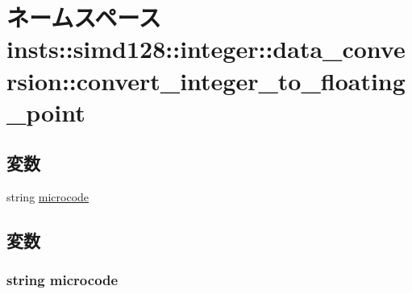 \hypertarget{namespaceinsts_1_1simd128_1_1integer_1_1data__conversion_1_1convert__integer__to__floating__point}{
\section{ネームスペース insts::simd128::integer::data\_\-conversion::convert\_\-integer\_\-to\_\-floating\_\-point}
\label{namespaceinsts_1_1simd128_1_1integer_1_1data__conversion_1_1convert__integer__to__floating__point}
}
\subsection*{変数}
\begin{DoxyCompactItemize}
\item 
string \hyperlink{namespaceinsts_1_1simd128_1_1integer_1_1data__conversion_1_1convert__integer__to__floating__point_a770f11a173e99389a8802f0107ed8f52}{microcode}
\end{DoxyCompactItemize}


\subsection{変数}
\hypertarget{namespaceinsts_1_1simd128_1_1integer_1_1data__conversion_1_1convert__integer__to__floating__point_a770f11a173e99389a8802f0107ed8f52}{
\subsubsection[{microcode}]{\setlength{\rightskip}{0pt plus 5cm}string {\bf microcode}}}
\label{namespaceinsts_1_1simd128_1_1integer_1_1data__conversion_1_1convert__integer__to__floating__point_a770f11a173e99389a8802f0107ed8f52}

